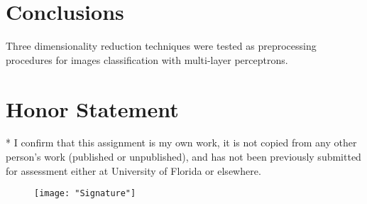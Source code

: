\documentclass[conference]{IEEEtran}
\begin{document}
\section{Conclusions} \label{Conclusions}
Three dimensionality reduction techniques were tested as preprocessing procedures for images classification with multi-layer perceptrons.



\section*{Honor Statement}
\noindent
* I confirm that this assignment is my own work, it is not copied from any other person's work (published or unpublished), and has not been previously submitted for assessment either at University of Florida or elsewhere.

\begin{figure}[h!]
	\centering
	\texttt{[image: "Signature"]}
\end{figure}



%
\end{document}
